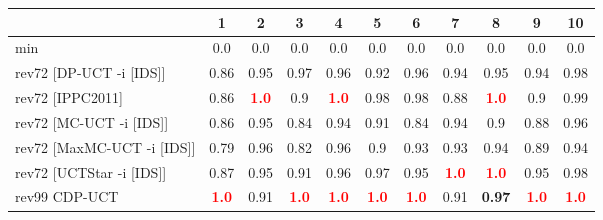 \documentclass{article}
\begin{document}
\begin{tabular}{|l|r@{$\pm$}rr@{$\pm$}rr@{$\pm$}rr@{$\pm$}rr@{$\pm$}rr@{$\pm$}rr@{$\pm$}rr@{$\pm$}rr@{$\pm$}rr@{$\pm$}r|}
\hline

& \multicolumn{2}{c}{1}
& \multicolumn{2}{c}{2}
& \multicolumn{2}{c}{3}
& \multicolumn{2}{c}{4}
& \multicolumn{2}{c}{5}
& \multicolumn{2}{c}{6}
& \multicolumn{2}{c}{7}
& \multicolumn{2}{c}{8}
& \multicolumn{2}{c}{9}
& \multicolumn{2}{c|}{10}
\\
\hline
\hline
min
& \multicolumn{2}{c}{0.0}
& \multicolumn{2}{c}{0.0}
& \multicolumn{2}{c}{0.0}
& \multicolumn{2}{c}{0.0}
& \multicolumn{2}{c}{0.0}
& \multicolumn{2}{c}{0.0}
& \multicolumn{2}{c}{0.0}
& \multicolumn{2}{c}{0.0}
& \multicolumn{2}{c}{0.0}
& \multicolumn{2}{c|}{0.0}
\\
rev72 [DP-UCT -i [IDS]]
& \multicolumn{2}{c}{0.86}
& \multicolumn{2}{c}{0.95}
& \multicolumn{2}{c}{0.97}
& \multicolumn{2}{c}{0.96}
& \multicolumn{2}{c}{0.92}
& \multicolumn{2}{c}{0.96}
& \multicolumn{2}{c}{0.94}
& \multicolumn{2}{c}{0.95}
& \multicolumn{2}{c}{0.94}
& \multicolumn{2}{c|}{0.98}
\\
rev72 [IPPC2011]
& \multicolumn{2}{c}{0.86}
& \multicolumn{2}{c}{\textbf{\textcolor{red}{1.0}}}
& \multicolumn{2}{c}{0.9}
& \multicolumn{2}{c}{\textbf{\textcolor{red}{1.0}}}
& \multicolumn{2}{c}{0.98}
& \multicolumn{2}{c}{0.98}
& \multicolumn{2}{c}{0.88}
& \multicolumn{2}{c}{\textbf{\textcolor{red}{1.0}}}
& \multicolumn{2}{c}{0.9}
& \multicolumn{2}{c|}{0.99}
\\
rev72 [MC-UCT -i [IDS]]
& \multicolumn{2}{c}{0.86}
& \multicolumn{2}{c}{0.95}
& \multicolumn{2}{c}{0.84}
& \multicolumn{2}{c}{0.94}
& \multicolumn{2}{c}{0.91}
& \multicolumn{2}{c}{0.84}
& \multicolumn{2}{c}{0.94}
& \multicolumn{2}{c}{0.9}
& \multicolumn{2}{c}{0.88}
& \multicolumn{2}{c|}{0.96}
\\
rev72 [MaxMC-UCT -i [IDS]]
& \multicolumn{2}{c}{0.79}
& \multicolumn{2}{c}{0.96}
& \multicolumn{2}{c}{0.82}
& \multicolumn{2}{c}{0.96}
& \multicolumn{2}{c}{0.9}
& \multicolumn{2}{c}{0.93}
& \multicolumn{2}{c}{0.93}
& \multicolumn{2}{c}{0.94}
& \multicolumn{2}{c}{0.89}
& \multicolumn{2}{c|}{0.94}
\\
rev72 [UCTStar -i [IDS]]
& \multicolumn{2}{c}{0.87}
& \multicolumn{2}{c}{0.95}
& \multicolumn{2}{c}{0.91}
& \multicolumn{2}{c}{0.96}
& \multicolumn{2}{c}{0.97}
& \multicolumn{2}{c}{0.95}
& \multicolumn{2}{c}{\textbf{\textcolor{red}{1.0}}}
& \multicolumn{2}{c}{\textbf{\textcolor{red}{1.0}}}
& \multicolumn{2}{c}{0.95}
& \multicolumn{2}{c|}{0.98}
\\
\hline
rev99 CDP-UCT
& \multicolumn{2}{c}{\textbf{\textcolor{red}{1.0}}}
& \multicolumn{2}{c}{0.91}
& \multicolumn{2}{c}{\textbf{\textcolor{red}{1.0}}}
& \multicolumn{2}{c}{\textbf{\textcolor{red}{1.0}}}
& \multicolumn{2}{c}{\textbf{\textcolor{red}{1.0}}}
& \multicolumn{2}{c}{\textbf{\textcolor{red}{1.0}}}
& \multicolumn{2}{c}{0.91}
& \multicolumn{2}{c}{\textbf{0.97}}
& \multicolumn{2}{c}{\textbf{\textcolor{red}{1.0}}}
& \multicolumn{2}{c|}{\textbf{\textcolor{red}{1.0}}}
\\
\hline
\end{tabular}%
\end{document}
